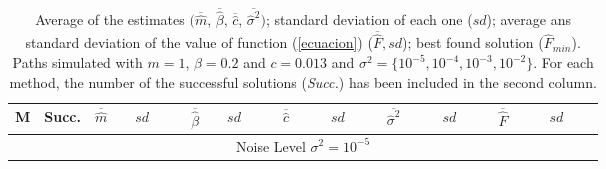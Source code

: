 \documentclass{sig-alternate}
\begin{document}
\begin{table*}
\caption{\footnotesize{Average of the estimates $(\overline{\hat{m}}$, $\overline{\hat{\beta}}$, $\overline{\hat{c}}$, $\overline{\hat{\sigma}^{2}})$; standard deviation of each one ($sd$); average ans standard deviation of the value of function (\ref{ecuacion}) ($\overline{\hat{F}},sd$); best found solution (${\hat{F}}_{min}$). Paths simulated with $m=1$, $\beta=0.2$ and $c=0.013$ and $\sigma^2=\{10^{-5},10^{-4},10^{-3},10^{-2}\}$. For each method, the number of the successful solutions (\emph{Succ.}) has been included in the second column.}}
\begin{center}
{\scriptsize
\begin{tabular}{lc|rrrrrrrrrr}
   M & Succ.  & $\overline{\hat{m}}\quad$&$sd\qquad$ &  $\overline{\hat{\beta}}\quad$ &$sd\qquad$ &  $\overline{\hat{c}}\qquad$ &$sd\qquad$ &  $\overline{\hat{\sigma}^{2}}\quad\quad$ &$sd\qquad$& $\overline{\hat{F}}\qquad$  &$sd\qquad$ \\
\hline
\multicolumn{12}{c}{Noise Level $\sigma^2=10^{-5}$} \\


\end{tabular}}
\end{center}
\end{table*}
\end{document}
